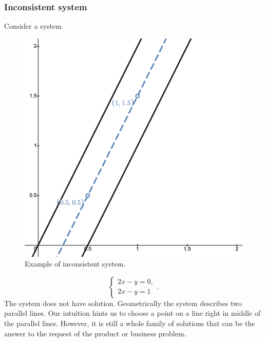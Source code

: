 \subsubsection*{Inconsistent system}    
     \Ex Consider a system~~~~~~~~~~~~~~~~~~~~~~~~~~~~~~~~~~~~~~~
        \begin{figure}
            \includegraphics[width=0.4\columnwidth]{lectures/images/inconsistent_system.png}
            \caption*{\scriptsize{Example of inconsistent system.}}
            \label{fig:inconsistent_with_vectors}
        \end{figure}  
        $$
            \left\{
                \begin{array}{c}
                    2x-y=0,\\
                    2x-y=1
                \end{array}.
            \right.  
        $$
        The system does not have solution. Geometrically the system describes two parallel lines. Our intuition hints us to choose a point on a line right in middle of the parallel lines. However, it is still a whole family of solutions that can be the answer to the request of the product or business problem. 
        \newpage
